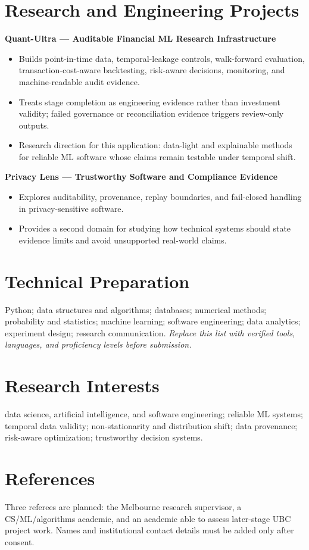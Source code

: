 \documentclass[11pt]{article}
\begin{document}
\section*{Research and Engineering Projects}
\textbf{Quant-Ultra --- Auditable Financial ML Research Infrastructure}
\begin{itemize}
\item Builds point-in-time data, temporal-leakage controls, walk-forward evaluation, transaction-cost-aware backtesting, risk-aware decisions, monitoring, and machine-readable audit evidence.
\item Treats stage completion as engineering evidence rather than investment validity; failed governance or reconciliation evidence triggers review-only outputs.
\item Research direction for this application: data-light and explainable methods for reliable ML software whose claims remain testable under temporal shift.
\end{itemize}

\begin{samepage}
\textbf{Privacy Lens --- Trustworthy Software and Compliance Evidence}
\begin{itemize}
\item Explores auditability, provenance, replay boundaries, and fail-closed handling in privacy-sensitive software.
\item Provides a second domain for studying how technical systems should state evidence limits and avoid unsupported real-world claims.
\end{itemize}
\end{samepage}

\section*{Technical Preparation}
Python; data structures and algorithms; databases; numerical methods; probability and statistics; machine learning; software engineering; data analytics; experiment design; research communication. \textit{Replace this list with verified tools, languages, and proficiency levels before submission.}

\section*{Research Interests}
data science, artificial intelligence, and software engineering; reliable ML systems; temporal data validity; non-stationarity and distribution shift; data provenance; risk-aware optimization; trustworthy decision systems.

\section*{References}
Three referees are planned: the Melbourne research supervisor, a CS/ML/algorithms academic, and an academic able to assess later-stage UBC project work. Names and institutional contact details must be added only after consent.
\end{document}
